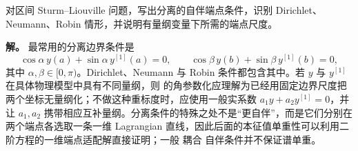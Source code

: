 \begin{example}[分离边界条件与量纲]
对区间 Sturm--Liouville 问题，写出分离的自伴端点条件，识别 Dirichlet、Neumann、Robin 情形，并说明有量纲变量下所需的端点尺度。

\textbf{解。} 最常用的分离边界条件是
\begin{equation}\label{eq:math-sl-separated-bc}
 \cos\alpha\,y(a)+\sin\alpha\,y^{[1]}(a)=0,
 \qquad
 \cos\beta\,y(b)+\sin\beta\,y^{[1]}(b)=0,
\end{equation}
其中 $\alpha,\beta\in[0,\pi)$。Dirichlet、Neumann 与 Robin 条件都包含其中。若 $y$ 与 $y^{[1]}$ 在具体物理模型中具有不同量纲，则 的角参数化应理解为已经用固定边界尺度把两个坐标无量纲化；不做这种重标度时，应使用一般实系数 $a_1y+a_2y^{[1]}=0$，并让 $a_1,a_2$ 携带相应互补量纲。分离条件的特殊之处不是“更自伴”，而是它们分别在两个端点各选取一条一维 Lagrangian 直线，因此后面的本征值单重性可以利用二阶方程的一维端点适配解直接证明；一般 耦合 自伴条件并不保证谱单重。
\end{example}

